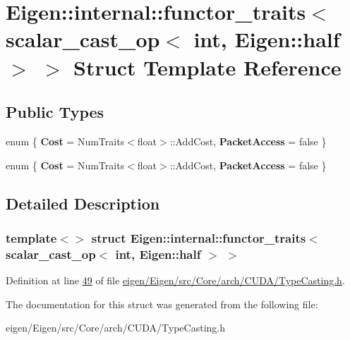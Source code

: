 \hypertarget{struct_eigen_1_1internal_1_1functor__traits_3_01scalar__cast__op_3_01int_00_01_eigen_1_1half_01_4_01_4}{}\section{Eigen\+:\+:internal\+:\+:functor\+\_\+traits$<$ scalar\+\_\+cast\+\_\+op$<$ int, Eigen\+:\+:half $>$ $>$ Struct Template Reference}
\label{struct_eigen_1_1internal_1_1functor__traits_3_01scalar__cast__op_3_01int_00_01_eigen_1_1half_01_4_01_4}
\subsection*{Public Types}
\begin{DoxyCompactItemize}
\item 
\mbox{\label{struct_eigen_1_1internal_1_1functor__traits_3_01scalar__cast__op_3_01int_00_01_eigen_1_1half_01_4_01_4_a1c17a505e2ca9224554fe86bbdbb22e3}} 
enum \{ {\bfseries Cost} = Num\+Traits$<$float$>$\+:\+:Add\+Cost, 
{\bfseries Packet\+Access} = false
 \}
\item 
\mbox{\label{struct_eigen_1_1internal_1_1functor__traits_3_01scalar__cast__op_3_01int_00_01_eigen_1_1half_01_4_01_4_af326448b05badd777b2cb4e6b6ee3740}} 
enum \{ {\bfseries Cost} = Num\+Traits$<$float$>$\+:\+:Add\+Cost, 
{\bfseries Packet\+Access} = false
 \}
\end{DoxyCompactItemize}


\subsection{Detailed Description}
\subsubsection*{template$<$$>$\newline
struct Eigen\+::internal\+::functor\+\_\+traits$<$ scalar\+\_\+cast\+\_\+op$<$ int, Eigen\+::half $>$ $>$}



Definition at line \hyperlink{eigen_2_eigen_2src_2_core_2arch_2_c_u_d_a_2_type_casting_8h_source_l00049}{49} of file \hyperlink{eigen_2_eigen_2src_2_core_2arch_2_c_u_d_a_2_type_casting_8h_source}{eigen/\+Eigen/src/\+Core/arch/\+C\+U\+D\+A/\+Type\+Casting.\+h}.



The documentation for this struct was generated from the following file\+:\begin{DoxyCompactItemize}
\item 
eigen/\+Eigen/src/\+Core/arch/\+C\+U\+D\+A/\+Type\+Casting.\+h\end{DoxyCompactItemize}

